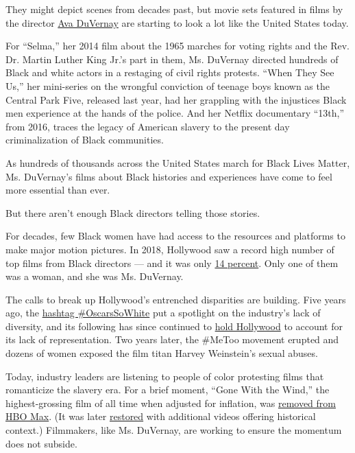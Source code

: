 They might depict scenes from decades past, but movie sets featured in
films by the director
\href{https://www.nytimes3xbfgragh.onion/2020/08/06/movies/ava-duvernay-gish-prize.html}{Ava
DuVernay} are starting to look a lot like the United States today.

For ``Selma,'' her 2014 film about the 1965 marches for voting rights
and the Rev. Dr. Martin Luther King Jr.'s part in them, Ms. DuVernay
directed hundreds of Black and white actors in a restaging of civil
rights protests. ``When They See Us,'' her mini-series on the wrongful
conviction of teenage boys known as the Central Park Five, released last
year, had her grappling with the injustices Black men experience at the
hands of the police. And her Netflix documentary ``13th,'' from 2016,
traces the legacy of American slavery to the present day criminalization
of Black communities.

As hundreds of thousands across the United States march for Black Lives
Matter, Ms. DuVernay's films about Black histories and experiences have
come to feel more essential than ever.

But there aren't enough Black directors telling those stories.

For decades, few Black women have had access to the resources and
platforms to make major motion pictures. In 2018, Hollywood saw a record
high number of top films from Black directors --- and it was only
\href{https://www.cnbc.com/2019/01/04/record-number-of-black-directors-among-2018s-top-films.html}{14
percent}. Only one of them was a woman, and she was Ms. DuVernay.

The calls to break up Hollywood's entrenched disparities are building.
Five years ago, the
\href{https://www.nytimes3xbfgragh.onion/2020/02/06/movies/oscarssowhite-history.html}{hashtag
\#OscarsSoWhite} put a spotlight on the industry's lack of diversity,
and its following has since continued to
\href{https://www.nytimes3xbfgragh.onion/2020/02/06/movies/oscarssowhite-history.html}{hold
Hollywood} to account for its lack of representation. Two years later,
the \#MeToo movement erupted and dozens of women exposed the film titan
Harvey Weinstein's sexual abuses.

Today, industry leaders are listening to people of color protesting
films that romanticize the slavery era. For a brief moment, ``Gone With
the Wind,'' the highest-grossing film of all time when adjusted for
inflation, was
\href{https://www.nytimes3xbfgragh.onion/2020/06/10/business/media/gone-with-the-wind-hbo-max.html}{removed
from HBO Max}. (It was later
\href{https://variety.com/2020/digital/news/gone-with-the-wind-hbo-max-disclaimer-horrors-slavery-1234648726/}{restored}
with additional videos offering historical context.) Filmmakers, like
Ms. DuVernay, are working to ensure the momentum does not subside.

